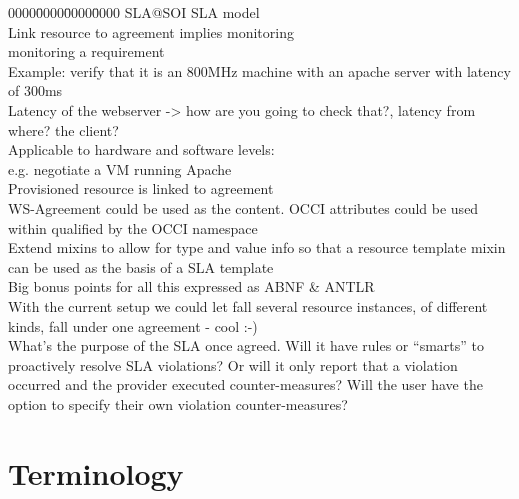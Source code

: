 \documentclass[12pt]{article}  %
\begin{document}
\begin{tabbing}
0000\=0000\=0000\=0000 \kill	
	\>SLA@SOI SLA model \\
	\>Link resource to agreement implies monitoring \\
	\>	\>monitoring a requirement \\
	\>Example: verify that it is an 800MHz machine with an apache server with latency of 300ms \\
	\>	\>Latency of the webserver -> how are you going to check that?, latency from where? the client?  \\
	\>Applicable to hardware and software levels: \\
	\>	\>e.g. negotiate a VM running Apache \\
	\>Provisioned resource is linked to agreement \\
	\>WS-Agreement could be used as the content. OCCI attributes could be used within qualified by the OCCI namespace \\
	\>Extend mixins to allow for type and value info so that a resource template mixin can be used as the basis of a SLA template \\
	\>Big bonus points for all this expressed as ABNF \& ANTLR \\
	\>With the current setup we could let fall several resource instances, of different kinds, fall under one agreement - cool :-) \\
	\>What’s the purpose of the SLA once agreed. Will it have rules or “smarts” to proactively resolve SLA violations? Or will it only report that a violation occurred and the provider executed counter-measures? Will the user have the option to specify their own violation counter-measures? \\
\end{tabbing}


\section*{Terminology}
\end{document}
